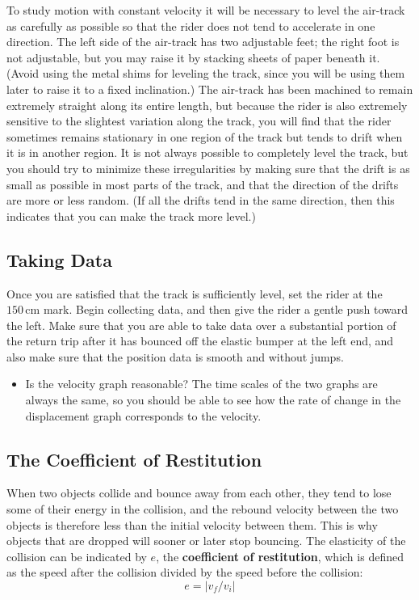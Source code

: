 To study motion with constant velocity it will be necessary to level the air-track as carefully as possible so that the rider does not tend to accelerate in one direction.  The left side of the air-track has two adjustable feet; the right foot is not adjustable, but you may raise it by stacking sheets of paper beneath it.  (Avoid using the metal shims for leveling the track, since you will be using them later to raise it to a fixed inclination.)  The air-track has been machined to remain extremely straight along its entire length, but because the rider is also extremely sensitive to the slightest variation along the track, you will find that the rider sometimes remains stationary in one region of the track but tends to drift when it is in another region.  It is not always possible to completely level the track, but you should try to minimize these irregularities by making sure that the drift is as small as possible in most parts of the track, and that the direction of the drifts are more or less random.  (If all the drifts tend in the same direction, then this indicates that you can make the track more level.)

\subsection{Taking Data}

Once you are satisfied that the track is sufficiently level, set the rider at the $150\,\mathrm{cm}$ mark.  Begin collecting data, and then give the rider a gentle push toward the left.  Make sure that you are able to take data over a substantial portion of the return trip after it has bounced off the elastic bumper at the left end, and also make sure that the position data is smooth and without jumps.

\begin{itemize}
    \item Is the velocity graph reasonable?  The time scales of the two graphs are always the same, so you should be able to see how the rate of change in the displacement graph corresponds to the velocity.
\end{itemize}

\subsection{The Coefficient of Restitution}

When two objects collide and bounce away from each other, they tend to lose some of their energy in the collision, and the rebound velocity between the two objects is therefore less than the initial velocity between them.  This is why objects that are dropped will sooner or later stop bouncing.  The elasticity of the collision can be indicated by $e$, the \textbf{coefficient of restitution}, which is defined as the speed after the collision divided by the speed before the collision:
\begin{equation}
    e = \left|v_f/v_i\right|
\end{equation}


